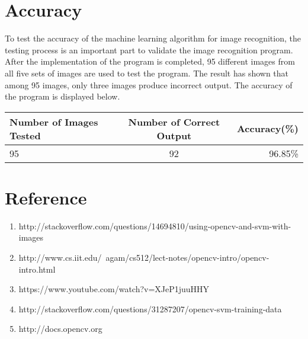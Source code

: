 \documentclass[a4paper]{article}
\begin{document}
\section{Accuracy}
To test the accuracy of the machine learning algorithm for image recognition, the testing process is an important part to validate the image recognition program. After the implementation of the program is completed, 95 different images from all five sets of images are used to test the program. The result has shown that among 95 images, only three images produce incorrect output. The accuracy of the program is displayed below.
\begin{center}
  \begin{tabular}{ l | c | r }
    \hline
    Number of Images Tested & Number of Correct Output & Accuracy(\%) \\ \hline
    95 & 92 & 96.85\% \\ \hline
    \hline
  \end{tabular}
\end{center}


\section{Reference}
\begin{enumerate}
\item http://stackoverflow.com/questions/14694810/using-opencv-and-svm-with-images
\item http://www.cs.iit.edu/~agam/cs512/lect-notes/opencv-intro/opencv-intro.html
\item https://www.youtube.com/watch?v=XJeP1juuHHY
\item http://stackoverflow.com/questions/31287207/opencv-svm-training-data
\item http://docs.opencv.org
\end{enumerate}
\end{document}
